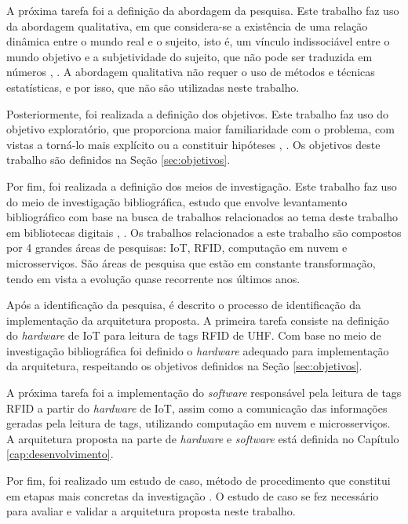 A próxima tarefa foi a definição da abordagem da pesquisa. Este trabalho faz uso da abordagem qualitativa, em que considera-se a existência de uma relação dinâmica entre o mundo real e o sujeito, isto é, um vínculo indissociável entre o mundo objetivo e a subjetividade do sujeito, que não pode ser traduzida em números \cite{Gil2008MetodosSocial}, \cite{Marconi2003FundamentosCientifica}. A abordagem qualitativa não requer o uso de métodos e técnicas estatísticas, e por isso, que não são utilizadas neste trabalho.

Posteriormente, foi realizada a definição dos objetivos. Este trabalho faz uso do objetivo exploratório, que proporciona maior familiaridade com o problema, com vistas a torná-lo mais explícito ou a constituir hipóteses \cite{Gil2008MetodosSocial}, \cite{Marconi2003FundamentosCientifica}. Os objetivos deste trabalho são definidos na Seção \ref{sec:objetivos}.

Por fim, foi realizada a definição dos meios de investigação. Este trabalho faz uso do meio de investigação bibliográfica, estudo que envolve levantamento bibliográfico com base na busca de trabalhos relacionados ao tema deste trabalho em bibliotecas digitais \cite{Gil2008MetodosSocial}, \cite{Marconi2003FundamentosCientifica}. Os trabalhos relacionados a este trabalho são compostos por 4 grandes áreas de pesquisas: \acrshort{IoT}, \acrshort{RFID}, computação em nuvem e microsserviços. São áreas de pesquisa que estão em constante transformação, tendo em vista a evolução quase recorrente nos últimos anos.

Após a identificação da pesquisa, é descrito o processo de identificação da implementação da arquitetura proposta. A primeira tarefa consiste na definição do \textit{hardware} de \acrshort{IoT} para leitura de tags \acrshort{RFID} de \acrshort{UHF}. Com base no meio de investigação bibliográfica foi definido o \textit{hardware} adequado para implementação da arquitetura, respeitando os objetivos definidos na Seção \ref{sec:objetivos}.

A próxima tarefa foi a implementação do \textit{software} responsável pela leitura de tags \acrshort{RFID} a partir do \textit{hardware} de \acrshort{IoT}, assim como a comunicação das informações geradas pela leitura de tags, utilizando computação em nuvem e microsserviços. A arquitetura proposta na parte de \textit{hardware} e \textit{software} está definida no Capítulo \ref{cap:desenvolvimento}.

Por fim, foi realizado um estudo de caso, método de procedimento que constitui em etapas mais concretas da investigação \cite{Runeson2012CaseEngineering}. O estudo de caso se fez necessário para avaliar e validar a arquitetura proposta neste trabalho. 


